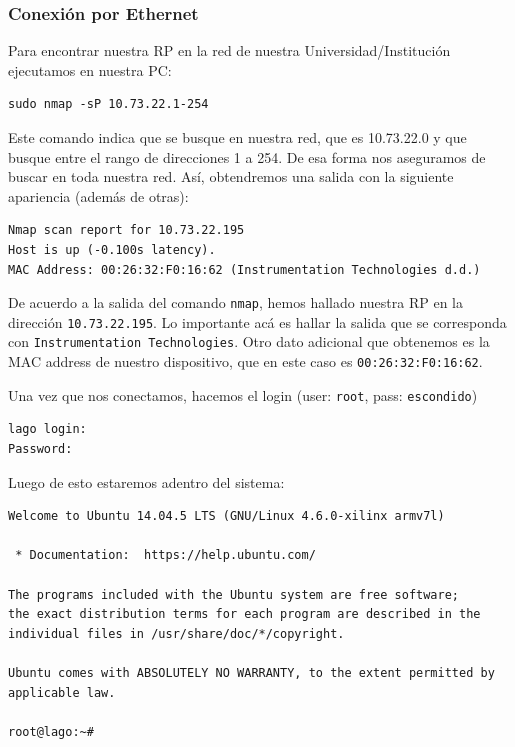 \documentclass[a4paper,11pt]{article}
\begin{document}
\subsubsection{Conexión por Ethernet}

Para encontrar nuestra RP en la red de nuestra Universidad/Institución
ejecutamos en nuestra PC:

\begin{verbatim}
sudo nmap -sP 10.73.22.1-254
\end{verbatim}

\noindent Este comando indica que se busque en nuestra red, que es 10.73.22.0 y que busque
entre el rango de direcciones 1 a 254. De esa forma nos aseguramos de buscar en
toda nuestra red. Así, obtendremos una salida con la siguiente apariencia
(además de otras):
 
\begin{verbatim}
Nmap scan report for 10.73.22.195
Host is up (-0.100s latency).
MAC Address: 00:26:32:F0:16:62 (Instrumentation Technologies d.d.)
\end{verbatim}

\noindent De acuerdo a la salida del comando \texttt{nmap}, hemos hallado nuestra RP en la
dirección \texttt{10.73.22.195}. Lo importante acá es hallar la salida que se
corresponda con \texttt{Instrumentation Technologies}. Otro dato adicional que
obtenemos es la MAC address de nuestro dispositivo, que en este caso es
\texttt{00:26:32:F0:16:62}. 

\noindent Una vez que nos conectamos, hacemos el login (user: \texttt{root}, pass: \texttt{escondido})
\begin{verbatim}
lago login: 
Password: 
\end{verbatim}

\noindent Luego de esto estaremos adentro del sistema:

\begin{verbatim}
Welcome to Ubuntu 14.04.5 LTS (GNU/Linux 4.6.0-xilinx armv7l)

 * Documentation:  https://help.ubuntu.com/

The programs included with the Ubuntu system are free software;
the exact distribution terms for each program are described in the
individual files in /usr/share/doc/*/copyright.

Ubuntu comes with ABSOLUTELY NO WARRANTY, to the extent permitted by
applicable law.

root@lago:~# 

\end{verbatim}
\end{document}
